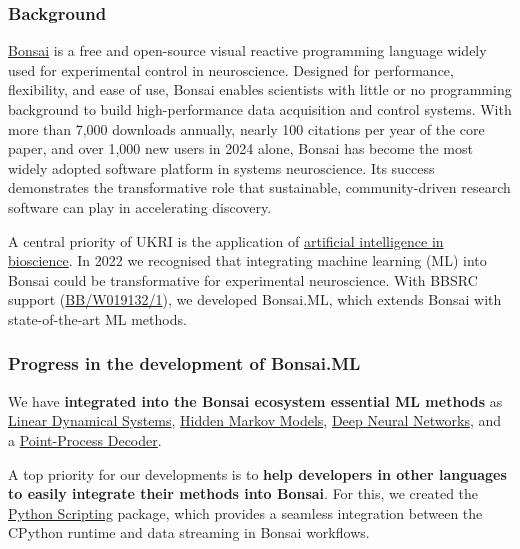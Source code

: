 \subsubsection{Background}


\href{https://bonsai-rx.org/}{Bonsai} is a free and open-source visual reactive
programming language widely used for experimental control in neuroscience.
Designed for performance, flexibility, and ease of use, Bonsai enables
scientists with little or no programming background to build high-performance
data acquisition and control systems. With more than 7,000 downloads annually,
nearly 100 citations per year of the core paper, and over 1,000 new users in
2024 alone, Bonsai has become the most widely adopted software platform in
systems neuroscience. Its success demonstrates the transformative role that
sustainable, community-driven research software can play in accelerating
discovery.


A central priority of UKRI is the application of
\href{https://www.ukri.org/what-we-do/browse-our-areas-of-investment-and-support/artificial-intelligence-in-bioscience/}{artificial
intelligence in bioscience}. In 2022 we recognised that integrating machine
learning (ML) into Bonsai could be transformative for experimental
neuroscience. With BBSRC support
(\href{https://gow.bbsrc.ukri.org/grants/AwardDetails.aspx?FundingReference=BB\%2FW019132\%2F1}{BB/W019132/1}),
we developed Bonsai.ML, which extends Bonsai with state-of-the-art ML methods.

\subsubsection{Progress in the development of Bonsai.ML}

We have \textbf{integrated into the Bonsai ecosystem essential ML methods} as
\href{https://bonsai-rx.org/machinelearning/examples/examples/LinearDynamicalSystems/README.html}{Linear
Dynamical Systems},
\href{https://bonsai-rx.org/machinelearning/examples/examples/HiddenMarkovModels/README.html}{Hidden
Markov Models},
\href{https://bonsai-rx.org/machinelearning/examples/examples/Torch/NeuralNetsTrainedOnline/README.html}{Deep
Neural Networks}, and a
\href{https://bonsai-rx.org/machinelearning/examples/examples/PointProcessDecoder/DecodePositionFromHippocampusSortedUnits/README.html}{Point-Process
Decoder}.

A top priority for our developments is to \textbf{help developers in other
languages to easily integrate their methods into Bonsai}. For this, we created
the \href{https://bonsai-rx.org/python-scripting/}{Python Scripting} package,
which provides a seamless integration between the CPython runtime and data
streaming in Bonsai workflows.

